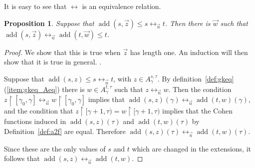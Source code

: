 \documentclass[
twoside,
]{article}
\newtheorem{proposition}[theorem]{Proposition}
\theoremstyle{definition}
\theoremstyle{remark}
\DeclareMathOperator{\add}{add}
\newcommand\gkeq{\leftrightarrow}
\newcommand{\restrict}{{\upharpoonright}}
\begin{document}
It is easy to see that $\gkeq$ is an equivalence relation.  

\begin{proposition}
  \label{thm:one-step-gkeq}
  Suppose that $\add(s, \vec z)\leq s\gkeq_{\vec n} t$.  Then
  there is $ \vec w$ such that $\add(s, \vec z)\gkeq_{\vec n}\add(t,  \vec w)\leq t$.
\end{proposition}

\begin{proof}
  We show that this is true when $\vec z$ has length one.   An
  induction will then show that it is true in general.     .

  Suppose that $\add(s,z)\leq s\gkeq_{\vec n} t$, with $z\in
  A^{s,\tau}_{\gamma}$.  By 
  definition~\ref{def:gkeq}(\ref{item:gkeq_Aeq})
  there is  
  $w\in A^{t,\tau}_{\gamma}$ such that $z\gkeq_{\vec n}w$.    Then
  the condition $z\restrict[\gamma_0,\gamma]\gkeq_{\vec
    n}w\restrict[\gamma_0,\gamma]$ implies that 
  $\add(s,z)(\gamma)\gkeq_{\vec n}\add(t,w)(\gamma)$, and the
  condition that $z\restrict[\gamma+1,\tau)=
  w\restrict[\gamma+1,\tau)$ implies that the Cohen functions induced in
  $\add(s,z)(\tau)$ and $\add(t,w)(\tau)$ 
  by Definition~\ref{def:a2f} are equal.  Therefore
  $\add(s,z)(\tau)\gkeq_{\vec n}\add(t,w)(\tau)$.  

  Since these are the only values of $s$ and $t$ which are changed in
  the extensions, 
  it follows that $\add(s,z)\gkeq_{\vec n}\add(t,w)$.
\end{proof}
\end{document}

